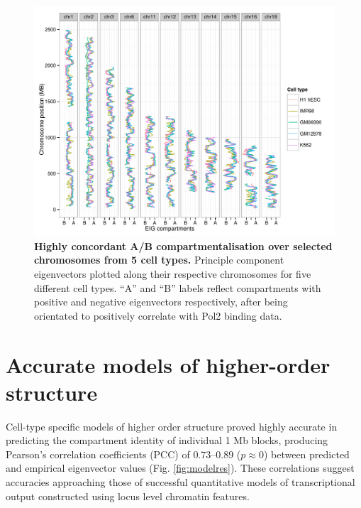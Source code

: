 \documentclass[a4paper]{report}
\begin{document}
\begin{figure}[H]
\begin{center}
\includegraphics[width=.95\textwidth]{figs/allCor.pdf}
\captionsetup{width=.9\textwidth}
\caption{ {\bf Highly concordant A/B compartmentalisation over selected chromosomes from 5 cell types.}
Principle component eigenvectors plotted along their respective
chromosomes for five different cell types. ``A'' and ``B''
labels reflect compartments with positive and negative 
eigenvectors respectively,\cite{Lieberman2011} after being orientated
to positively correlate with Pol2 binding data.\cite{Kalhor2012}
}\label{fig:eigcorr}
\end{center} 
\end{figure} 

\section{Accurate models of higher-order structure}
Cell-type specific models of higher order structure proved highly
accurate in predicting the compartment identity of individual 1 Mb blocks, producing Pearson's correlation
  coefficients (PCC) of $0.73$--$0.89$ ($p \approx 0$) between
  predicted and empirical eigenvector values
  (Fig. \ref{fig:modelres}). These correlations suggest accuracies approaching those of successful quantitative models of transcriptional output constructed using locus level chromatin features.\cite{Dong2012}
\end{document}
